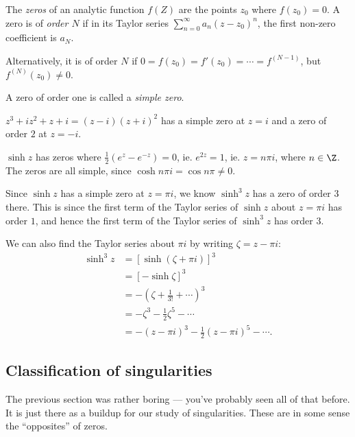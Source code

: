 \documentclass[a4paper]{article}
\begin{document}
\begin{defi}[Zeros]
  The \emph{zeros} of an analytic function $f(Z)$ are the points $z_0$ where $f(z_0) = 0$. A zero is of \emph{order $N$} if in its Taylor series $\sum_{n = 0}^\infty a_n (z - z_0)^n$, the first non-zero coefficient is $a_N$.

  Alternatively, it is of order $N$ if $0 = f(z_0) = f'(z_0) = \cdots = f^{(N - 1)}$, but $f^{(N)}(z_0) \not= 0$.
\end{defi}

\begin{defi}
  A zero of order one is called a \emph{simple zero}.
\end{defi}

\begin{eg}
  $z^3 + iz^2 + z + i = (z - i)(z + i)^2$ has a simple zero at $z = i$ and a zero of order $2$ at $z = -i$.
\end{eg}

\begin{eg}
  $\sinh z$ has zeros where $\frac{1}{2}(e^z - e^{-z}) = 0$, ie. $e^{2z} = 1$, ie. $z = n \pi i$, where $n \in \Z$. The zeros are all simple, since $\cosh n\pi i = \cos n \pi \not= 0$.
\end{eg}

\begin{eg}
  Since $\sinh z$ has a simple zero at $z = \pi i$, we know $\sinh^3 z$ has a zero of order $3$ there. This is since the first term of the Taylor series of $\sinh z$ about $z = \pi i$ has order $1$, and hence the first term of the Taylor series of $\sinh ^3 z$ has order $3$.

  We can also find the Taylor series about $\pi i$ by writing $\zeta = z - \pi i$:
  \begin{align*}
    \sinh^3 z &= [\sinh(\zeta + \pi i)]^3\\
    &= [-\sinh \zeta]^3\\
    &= -\left(\zeta + \frac{1}{3!} + \cdots \right)^3\\
    &= - \zeta^3 - \frac{1}{2} \zeta^5 - \cdots\\
    &= -(z - \pi i)^3 - \frac{1}{2} (z - \pi i)^5 - \cdots.
  \end{align*}
\end{eg}
\subsection{Classification of singularities}
The previous section was rather boring --- you've probably seen all of that before. It is just there as a buildup for our study of singularities. These are in some sense the ``opposites'' of zeros.
\end{document}
